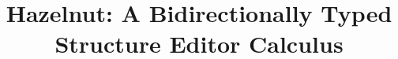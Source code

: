 \documentclass[preprint,9pt]{sigplanconf}
\begin{document}
\conferenceinfo{-}{-}
\copyrightyear{-}
\copyrightdata{[to be supplied]}


\title{Hazelnut: A Bidirectionally Typed \\ Structure Editor
 Calculus}

\authorinfo{~}{~}{\vspace{-10px}}

\maketitle
\end{document}
